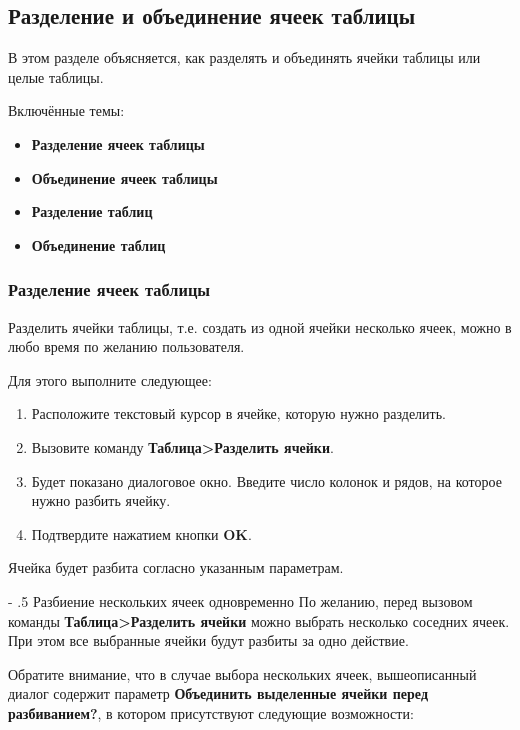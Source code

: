 ﻿\documentclass[a4paper,10pt]{article}
\makeatletter
\renewcommand\paragraph{%
   \@startsection{paragraph}{4}{0mm}%
      {-\baselineskip}%
      {.5\baselineskip}%
      {\normalfont\normalsize\bfseries}}
\makeatother
\begin{document}
\subsection{Разделение и объединение ячеек таблицы}
В этом разделе объясняется, как разделять и объединять ячейки таблицы или целые таблицы.

Включённые темы:

\begin{itemize}
 \item \textbf{Разделение ячеек таблицы}
 \item \textbf{Объединение ячеек таблицы}
 \item \textbf{Разделение таблиц}
 \item \textbf{Объединение таблиц}
\end{itemize}

\subsubsection{Разделение ячеек таблицы}
Разделить ячейки таблицы, т.е. создать из одной ячейки несколько ячеек, можно в любо время по желанию пользователя. 

Для этого выполните следующее:

\begin{enumerate}
 \item Расположите текстовый курсор в ячейке, которую нужно разделить.
 \item Вызовите команду \textbf{Таблица>Разделить ячейки}.
 \item Будет показано диалоговое окно. Введите число колонок и рядов, на которое нужно разбить ячейку.
 \item Подтвердите нажатием кнопки \textbf{OK}.
\end{enumerate}

Ячейка будет разбита согласно указанным параметрам.

\paragraph{Разбиение нескольких ячеек одновременно}
По желанию, перед вызовом команды \textbf{Таблица>Разделить ячейки} можно выбрать несколько соседних ячеек. При этом все выбранные ячейки будут разбиты за одно  действие. 

Обратите внимание, что в случае выбора нескольких ячеек, вышеописанный диалог содержит параметр \textbf{Объединить выделенные ячейки перед разбиванием?}, в котором присутствуют следующие возможности: 
\end{document}
